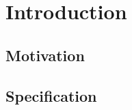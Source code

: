 \section{Introduction}
\label{intro}

\subsection{Motivation}
\label{motivation}

\subsection{Specification}
\label{spec}
